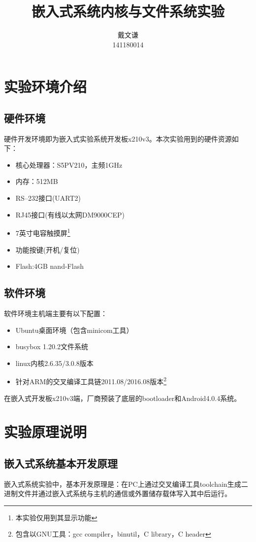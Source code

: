 \documentclass[hyperref,UTF8]{ctexart}
\title{\heiti 嵌入式系统内核与文件系统实验}
\author{\kaishu 戴文谦\\141180014}
\date{}
\begin{document}
\maketitle
\tableofcontents
\section{实验环境介绍}\label{sec:env-intro}

\subsection{硬件环境}\label{subsec:hw-intro}
硬件开发环境即为嵌入式实验系统开发板x210v3。本次实验用到的硬件资源如下：
\begin{itemize}
    \item 核心处理器：S5PV210，主频1GHz
    \item 内存：512MB
    \item RS--232接口(UART2)
    \item RJ45接口(有线以太网DM9000CEP)
    \item 7英寸电容触摸屏\footnote{本实验仅用到其显示功能}
    \item 功能按键(开机/复位)
    \item Flash:4GB nand-Flash
\end{itemize}

\subsection{软件环境}\label{subsec:sw-intro}
软件环境主机端主要有以下配置：
\begin{itemize}
    \item Ubuntu桌面环境（包含minicom工具）
    \item busybox 1.20.2文件系统
    \item linux内核2.6.35/3.0.8版本
    \item 针对ARM的交叉编译工具链2011.08/2016.08版本\footnote{包含以GNU工具：gcc compiler，binutil，C library，C header}
\end{itemize}
在嵌入式开发板x210v3端，厂商预装了底层的bootloader和Android4.0.4系统。

\section{实验原理说明}\label{sec:exp-prin}

\subsection{嵌入式系统基本开发原理}
嵌入式系统实验中，基本开发原理是：在PC上通过交叉编译工具toolchain生成二进制文件并通过嵌入式系统与主机的通信或外置储存载体写入其中后运行。
\end{document}
